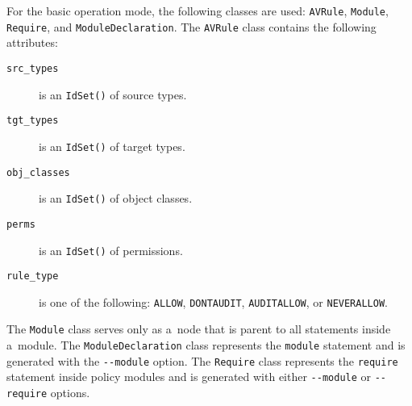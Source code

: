 For the basic operation mode, the following classes are used: \texttt{AVRule},
\texttt{Module}, \texttt{Require}, and \texttt{ModuleDeclaration}. The
\texttt{AVRule} class contains the following attributes:
\begin{description}
    \item [\texttt{src\_types}] is an \texttt{IdSet()} of source types.
    \item [\texttt{tgt\_types}] is an \texttt{IdSet()} of target types.
    \item [\texttt{obj\_classes}] is an \texttt{IdSet()} of object classes.
    \item [\texttt{perms}] is an \texttt{IdSet()} of permissions.
    \item [\texttt{rule\_type}] is one of the following: \texttt{ALLOW},
        \texttt{DONTAUDIT}, \texttt{AUDITALLOW}, or \texttt{NEVERALLOW}.
\end{description}
The \texttt{Module} class serves only as a~node that is parent to all statements
inside a~module. The \texttt{ModuleDeclaration} class represents the
\texttt{module} statement and is generated with the \texttt{-{}-module} option.
The \texttt{Require} class represents the \texttt{require} statement inside
policy modules and is generated with either \texttt{-{}-module} or
\texttt{-{}-require} options.


